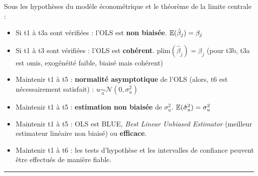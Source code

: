 \begin{f}
\end{f}    

\begin{f}
	
Sous les hypothèses du modèle économétrique et le théorème de la limite centrale :

\begin{itemize}[leftmargin=*]
	\item Si t1 à t3a sont vérifiées : l'OLS est \textbf{non biaisée}. \(\mathbb{E}(\hat{\beta}_{j}) = \beta_{j}\)
	\item Si t1 à t3 sont vérifiées : l'OLS est \textbf{cohérent}. \(\mathrm{plim}(\hat{\beta}_{j}) = \beta_{j}\) (pour t3b, t3a est omis, exogénéité faible, biaisé mais cohérent)
	\item Maintenir t1 à t5 : \textbf{normalité asymptotique} de l'OLS (alors, t6 est nécessairement satisfait) : \(u \underset{a}{\sim}\mathcal{N}(0, \sigma^{2}_{u})\)
	\item Maintenir t1 à t5 : \textbf{estimation non biaisée} de \(\sigma^{2}_{u}\). \(\mathbb{E}(\hat{\sigma}^{2}_{u}) = \sigma^{2}_{u}\)
	\item Maintenir t1 à t5 : OLS est \textcolor{BleuProfondIRA}{BLUE, \emph{Best Linear Unbiased Estimator}} (meilleur estimateur linéaire non biaisé) ou \textbf{efficace}.
	\item Maintenir t1 à t6 : les tests d'hypothèse et les intervalles de confiance peuvent être effectués de manière fiable.
\end{itemize}


\end{f}  \hrule


